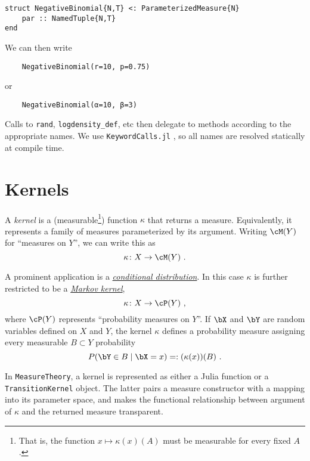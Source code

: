 \documentclass{juliacon}
\begin{document}
\begin{verbatim}
struct NegativeBinomial{N,T} <: ParameterizedMeasure{N}
    par :: NamedTuple{N,T}
end
\end{verbatim}

We can then write 
\begin{verbatim}
    NegativeBinomial(r=10, p=0.75)
\end{verbatim}
or
\begin{verbatim}
    NegativeBinomial(α=10, β=3)
\end{verbatim}

Calls to \verb|rand|, \verb|logdensity_def|, etc then delegate to methods according to the appropriate names. We use \verb|KeywordCalls.jl| \cite{KeywordCalls.jl}, so all names are resolved statically at compile time.

\section{Kernels}

A \emph{kernel} is a (measurable\footnote{That is, the function $x \mapsto \kappa(x)(A)$ must be measurable for every fixed $A$.}) function $\kappa$ that returns a measure. Equivalently, it represents a family of measures parameterized by its argument. Writing $\cM(Y)$ for ``measures on $Y$'', we can write this as
\[
\kappa\colon X \to \cM(Y)\ .
\]

A prominent application is a \href{https://en.wikipedia.org/wiki/Conditional_probability_distribution}{\emph{conditional distribution}}. In this case $\kappa$ is further restricted to be a \href{https://en.wikipedia.org/wiki/Markov_kernel}{\emph{Markov kernel}}, 
\[
\kappa\colon X \to \cP(Y)\ ,
\]
where $\cP(Y)$ represents ``probability measures on $Y$''.
If $\bX$ and $\bY$ are random variables defined on $X$ and $Y$, the kernel $\kappa$ defines a probability measure assigning every measurable $B\subset Y$ probability
\[
P(\bY \in B \mid \bX = x) =: (\kappa(x))(B)\ .
\]

In \verb|MeasureTheory|, a kernel is represented as either a Julia function or a \verb|TransitionKernel| object. The latter pairs a measure constructor with a mapping into its parameter space, and makes the functional relationship between argument of $\kappa$ and the returned measure transparent.
\end{document}
